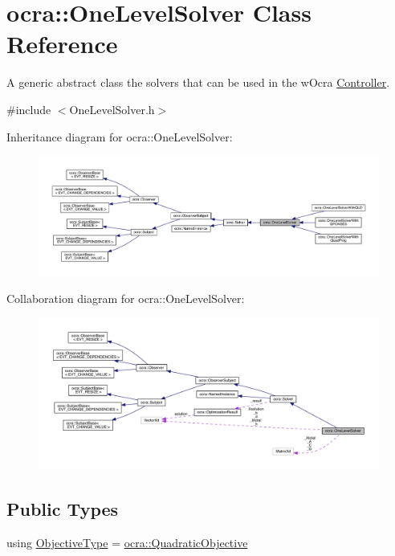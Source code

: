 \hypertarget{classocra_1_1OneLevelSolver}{}\section{ocra\+:\+:One\+Level\+Solver Class Reference}
\label{classocra_1_1OneLevelSolver}


A generic abstract class the solvers that can be used in the w\+Ocra \hyperlink{classocra_1_1Controller}{Controller}.  




{\ttfamily \#include $<$One\+Level\+Solver.\+h$>$}



Inheritance diagram for ocra\+:\+:One\+Level\+Solver\+:\nopagebreak
\begin{figure}[H]
\begin{center}
\leavevmode
\includegraphics[width=350pt]{d2/d00/classocra_1_1OneLevelSolver__inherit__graph}
\end{center}
\end{figure}


Collaboration diagram for ocra\+:\+:One\+Level\+Solver\+:\nopagebreak
\begin{figure}[H]
\begin{center}
\leavevmode
\includegraphics[width=350pt]{d9/d33/classocra_1_1OneLevelSolver__coll__graph}
\end{center}
\end{figure}
\subsection*{Public Types}
\begin{DoxyCompactItemize}
\item 
using \hyperlink{classocra_1_1OneLevelSolver_a93b0be052a859bbd4c81584aa1646ffb}{Objective\+Type} = \hyperlink{namespaceocra_a0b50673710f087c0f1733aefd1a8e0f7}{ocra\+::\+Quadratic\+Objective}
\end{DoxyCompactItemize}
